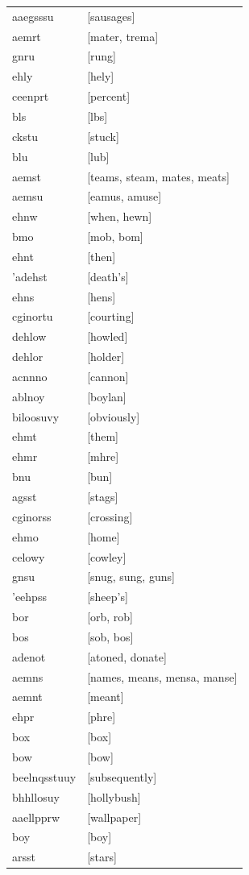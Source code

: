 \documentclass{article}
\begin{document}
\begin{tabular}{ll}
aaegsssu & [sausages] \\
aemrt & [mater, trema] \\
gnru & [rung] \\
ehly & [hely] \\
ceenprt & [percent] \\
bls & [lbs] \\
ckstu & [stuck] \\
blu & [lub] \\
aemst & [teams, steam, mates, meats] \\
aemsu & [eamus, amuse] \\
ehnw & [when, hewn] \\
bmo & [mob, bom] \\
ehnt & [then] \\
'adehst & [death's] \\
ehns & [hens] \\
cginortu & [courting] \\
dehlow & [howled] \\
dehlor & [holder] \\
acnnno & [cannon] \\
ablnoy & [boylan] \\
biloosuvy & [obviously] \\
ehmt & [them] \\
ehmr & [mhre] \\
bnu & [bun] \\
agsst & [stags] \\
cginorss & [crossing] \\
ehmo & [home] \\
celowy & [cowley] \\
gnsu & [snug, sung, guns] \\
'eehpss & [sheep's] \\
bor & [orb, rob] \\
bos & [sob, bos] \\
adenot & [atoned, donate] \\
aemns & [names, means, mensa, manse] \\
aemnt & [meant] \\
ehpr & [phre] \\
box & [box] \\
bow & [bow] \\
beelnqsstuuy & [subsequently] \\
bhhllosuy & [hollybush] \\
aaellpprw & [wallpaper] \\
boy & [boy] \\
arsst & [stars] \\

\end{tabular}
\end{document}
